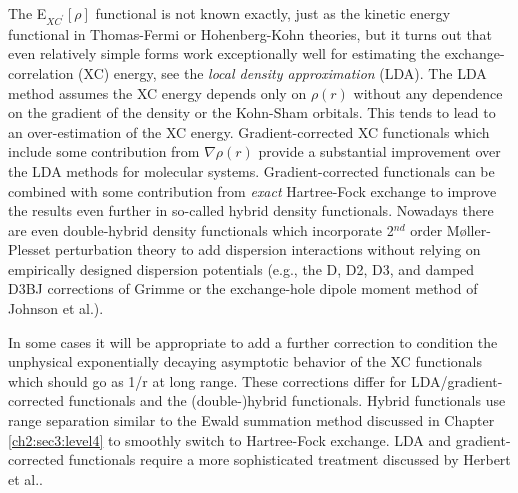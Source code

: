 \begin{theory}
  The E$_{XC^{\prime}}\left[\rho\right]$ functional is not known exactly, just as the kinetic energy functional
  in Thomas-Fermi or Hohenberg-Kohn theories, but it turns out that even relatively simple forms work exceptionally
  well for estimating the exchange-correlation (XC) energy, see the \emph{local density approximation} (LDA). The 
  LDA method assumes the XC energy depends only on $\rho(r)$ without any dependence on the gradient of the density
  or the Kohn-Sham orbitals. This tends to lead to an over-estimation of the XC energy. Gradient-corrected XC
  functionals which include some contribution from $\nabla\rho(r)$ provide a substantial improvement over the LDA
  methods for molecular systems. Gradient-corrected functionals can be combined with some contribution from 
  \emph{exact} Hartree-Fock exchange to improve the results even further in so-called hybrid density functionals.
  Nowadays there are even double-hybrid density functionals which incorporate 2$^{nd}$ order M$\text{\o}$ller-Plesset 
  perturbation theory to add dispersion interactions without relying on empirically designed dispersion potentials
  (e.g., the D, D2, D3, and damped D3BJ corrections of Grimme or the exchange-hole dipole moment method of Johnson
  et al.\cite{becke2005exchange}). 
  
  In some cases it will be appropriate to add a further correction to condition the unphysical exponentially 
  decaying asymptotic behavior of the XC functionals which should go as 1/r at long range. These corrections differ
  for LDA/gradient-corrected functionals and the (double-)hybrid functionals. Hybrid functionals use range 
  separation similar to the Ewald summation method discussed in Chapter \ref{ch2:sec3:level4} to smoothly switch 
  to Hartree-Fock exchange. LDA and gradient-corrected functionals require a more sophisticated treatment discussed
  by Herbert et al.\cite{lao2014xsaptksd3}.
  

\end{theory}
